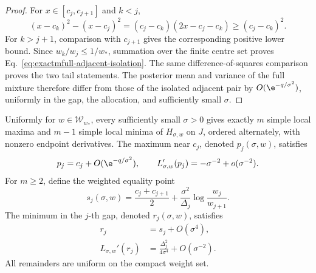 \begin{proof}
For \(x\in[c_j,c_{j+1}]\) and \(k<j\),
\begin{equation}
 (x-c_k)^2-(x-c_j)^2
 =(c_j-c_k)(2x-c_j-c_k)\ge(c_j-c_k)^2.
 \label{eq:exactmfull-left-square-comparison}
\end{equation}
For \(k>j+1\), comparison with \(c_{j+1}\) gives the corresponding positive
lower bound.  Since \(w_k/w_j\le1/w_*\), summation over the finite centre set
proves Eq.~\eqref{eq:exactmfull-adjacent-isolation}.  The same
difference-of-squares comparison proves the two tail statements.  The
posterior mean and variance of the full mixture therefore differ from those
of the isolated adjacent pair by \(O(\e^{-q/\sigma^2})\), uniformly in the
gap, the allocation, and sufficiently small \(\sigma\).
\end{proof}

\begin{theorem}
\label{thm:exactmfull-pure-topology}
Uniformly for \(w\in\mathcal W_{w_*}\), every sufficiently small
\(\sigma>0\) gives exactly \(m\) simple local maxima and \(m-1\) simple local
minima of \(H_{\sigma,w}\) on \(J\), ordered alternately, with nonzero
endpoint derivatives.  The maximum near \(c_j\), denoted \(p_j(\sigma,w)\),
satisfies
\begin{equation}
 p_j=c_j+O(\e^{-q/\sigma^2}),
 \qquad L_{\sigma,w}'(p_j)
 =-\sigma^{-2}+o(\sigma^{-2}).
 \label{eq:exactmfull-peak-location}
\end{equation}
For \(m\ge2\), define the weighted equality point
\begin{equation}
 s_j(\sigma,w)
 =\frac{c_j+c_{j+1}}2
  +\frac{\sigma^2}{\Delta_j}\log\frac{w_j}{w_{j+1}}.
 \label{eq:exactmfull-weighted-crossover}
\end{equation}
The minimum in the \(j\)-th gap, denoted \(r_j(\sigma,w)\), satisfies
\begin{align}
 r_j&=s_j+O(\sigma^4),
 \label{eq:exactmfull-valley-location}\\
 L_{\sigma,w}'(r_j)
 &=\frac{\Delta_j^2}{4\sigma^4}+O(\sigma^{-2}).
 \label{eq:exactmfull-valley-curvature}
\end{align}
All remainders are uniform on the compact weight set.
\end{theorem}

